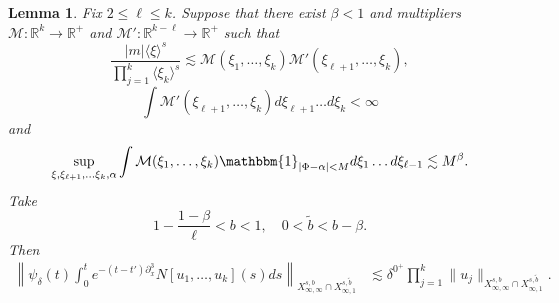 \documentclass[%
11pt,  reqno]{amsart}
\newcommand{\jap}[1]{\langle #1 \rangle}
\newcommand{\5}{\textup{V}}
\newcommand{\les}{\lesssim}
\newcommand{\wt}{\widetilde}
\newtheorem{lemma}[theorem]{Lemma}
\theoremstyle{remark}
\newtheorem{remark}[theorem]{Remark}
\newcommand{\R}{\mathbb{R}}
\numberwithin{equation}{section}
\numberwithin{theorem}{section}
\begin{document}
{		\begin{lemma}\label{lem:reduction_fre_kge3}
			Fix $2\le \ell\le k$. Suppose that there exist $\beta<1$ and multipliers $\mathcal{M}:\R^k\to \R^+$ and $\mathcal{M}':\R^{k-\ell}\to \R^+$ such that
			\begin{equation}
				\frac{|m|\jap{\xi}^s}{\prod_{j=1}^k\jap{\xi_k}^s} \lesssim \mathcal{M}(\xi_1,\dots, \xi_{k})\mathcal{M}'(\xi_{\ell+1},\dots, \xi_{{k}}),
			\end{equation}
			\begin{equation}
				\int \mathcal{M}'(\xi_{\ell+1},\dots, \xi_{{k}}) d\xi_{\ell+1}\dots d\xi_k <\infty
			\end{equation}
			and
			\begin{equation}\label{fre_kge3}
				\sup_{\xi, \xi_{\ell+1},\dots \xi_{k},\alpha} \int \mathcal{M}(\xi_1,\dots,\xi_k) \mathbbm{1}_{|\Phi-\alpha|<M} d\xi_1\dots d\xi_{\ell-1} \lesssim  M^\beta.
			\end{equation}
			Take
            $$
            1-\frac{1-\beta}{\ell}<b<1,\quad 0<\tilde{b}<b-\beta.
            $$
Then 
			\begin{align}
				\left\|\psi_\delta(t)\int_0^te^{-(t-t')\partial_x^3}N[u_1,\dots, u_k](s)ds \right\|_{X^{s,b}_{\infty, \infty}\cap X^{s,\tilde{b}}_{\infty, 1}} & \les \delta^{0^+}\prod_{j=1}^k\|u_j\|_{X^{s,b}_{\infty, \infty} \cap X^{s,\tilde{b}}_{\infty,1}}.
			\end{align}
			
		\end{lemma}
		
}
\end{document}
